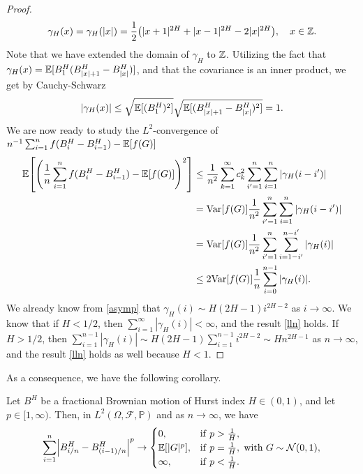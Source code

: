 \begin{proof}
\begin{equation}
    \gamma_{H}(x)=\gamma_{H}(|x|)=\frac{1}{2}\left(|x+1|^{2H}+|x-1|^{2H}-2|x|^{2H}\right), \quad x\in \Z. 
\end{equation}
Note that we have extended the domain of $\gamma_{H}$ to $\mathbb{Z}$. Utilizing the fact that $\gamma_{H}(x)=\mathbb{E}[B_{1}^{H}(B_{|x|+1}^{H}-B_{|x|}^{H})]$, and that the covariance is an inner product, we get by Cauchy-Schwarz
\begin{align}
     |\gamma_{H}(x)|\leq \sqrt{\mathbb{E}[(B_{1}^{H})^{2}]}\sqrt{\mathbb{E}[(B_{|x|+1}^{H}-B_{|x|}^{H})^{2}]}=1.
\end{align}
We are now ready to study the $L^2$-convergence of $n^{-1}\sum_{i=1}^{n}f(B_{i}^{H}-B_{i-1}^{H})-\mathbb{E}[f(G)]$
\begin{align}
    \E\left[\left(\frac{1}{n}\sum_{i=1}^{n}f(B_{i}^{H}-B_{i-1}^{H})-\E[f(G)]\right)^{2}\right] &\leq \frac{1}{n^{2}}\sum_{k=1}^{\infty}c_{k}^{2}\sum_{i'=1}^{n}\sum_{i =1}^{n}|\gamma_{H}(i-i')|\\
    &= \mathrm{Var}[f(G)]\frac{1}{n^2}\sum_{i'=1}^{n}\sum_{i =1}^{n}|\gamma_{H}(i-i')|\\
    &= \mathrm{Var}[f(G)]\frac{1}{n^2}\sum_{i'=1}^{n}\sum_{i=1-i'}^{n-i'}|\gamma_{H}(i)|\\
    &\leq 2\mathrm{Var}[f(G)]\frac{1}{n}\sum_{i=0}^{n-1}|\gamma_{H}(i)|.
\end{align}
We already know from \eqref{asymp} that $\gamma_{H}(i)\sim H(2H-1)i^{2H-2}$ as $i\to \infty$. We know that if $H<1/2$, then $\sum_{i=1}^{\infty}|\gamma_{H}(i)|<\infty$, and the result \eqref{lln} holds. If $H>1/2$, then $\sum_{i=1}^{n-1}|\gamma_{H}(i)|\sim H(2H-1)\sum_{i=1}^{n-1}i^{2H-2}\sim Hn^{2H-1}$ as $n\to \infty$, and the result \eqref{lln} holds as well because $H<1$.
\end{proof}
As a consequence, we have the following corollary.
\begin{cor}\label{pvariations}
    Let $B^H$ be a fractional Brownian motion of Hurst index $H\in (0,1)$, and let $p\in [1,\infty)$. Then, in $L^{2}(\Omega,\mathcal{F},\mathbb{P})$ and as $n\to\infty$, we have
    \begin{equation}
        \sum_{i=1}^{n}\left|B_{i/n}^{H}-B_{(i-1)/n}^{H}\right|^{p}\to \begin{cases}
            0, & \mathrm{if} \hspace{3 pt}p>\frac{1}{H},\\
            \E[|G|^{p}], & \mathrm{if}\hspace{3 pt}p=\frac{1}{H},\hspace{3 pt} \mathrm{with}\hspace{3 pt} G\sim \mathcal{N}(0,1),\\
            \infty, & \mathrm{if}\hspace{3 pt}p<\frac{1}{H}.
        \end{cases}
    \end{equation}
\end{cor}

